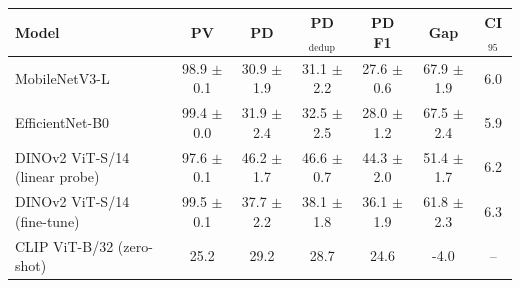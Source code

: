 \begin{tabular}{lcccccc}\toprule
Model & PV & PD & PD$_\text{dedup}$ & PD F1 & Gap & CI$_{95}$ \\\midrule
MobileNetV3-L & 98.9 $\pm$ 0.1 & 30.9 $\pm$ 1.9 & 31.1 $\pm$ 2.2 & 27.6 $\pm$ 0.6 & 67.9 $\pm$ 1.9 & 6.0 \\
EfficientNet-B0 & 99.4 $\pm$ 0.0 & 31.9 $\pm$ 2.4 & 32.5 $\pm$ 2.5 & 28.0 $\pm$ 1.2 & 67.5 $\pm$ 2.4 & 5.9 \\
DINOv2 ViT-S/14 (linear probe) & 97.6 $\pm$ 0.1 & 46.2 $\pm$ 1.7 & 46.6 $\pm$ 0.7 & 44.3 $\pm$ 2.0 & 51.4 $\pm$ 1.7 & 6.2 \\
DINOv2 ViT-S/14 (fine-tune) & 99.5 $\pm$ 0.1 & 37.7 $\pm$ 2.2 & 38.1 $\pm$ 1.8 & 36.1 $\pm$ 1.9 & 61.8 $\pm$ 2.3 & 6.3 \\
CLIP ViT-B/32 (zero-shot) & 25.2 & 29.2 & 28.7 & 24.6 & -4.0 & -- \\
\bottomrule\end{tabular}
